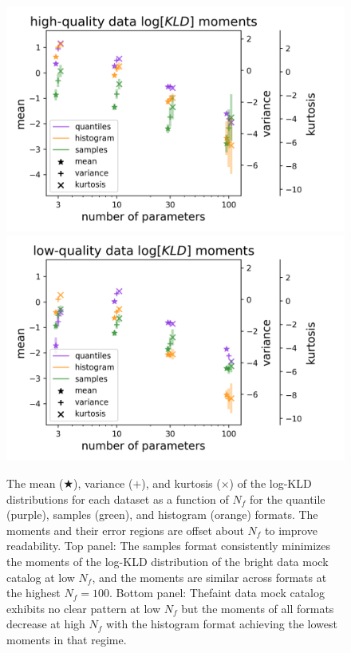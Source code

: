\documentclass[\docopts]{\docclass}
\newcommand{\mgdata}{bright\xspace}
\newcommand{\ssdata}{faint\xspace}
\begin{document}
\begin{figure}
  \begin{center}
    \includegraphics[width=\columnwidth]{graham_moments.png}\\
    \includegraphics[width=\columnwidth]{schmidt_moments.png}
    \caption{The mean ($\bigstar$), variance ($+$), and kurtosis ($\times$) of 
the log-KLD distributions for each dataset as a function of $N_{f}$ for the 
quantile (purple), samples (green), and histogram (orange) formats.
    The moments and their error regions are offset about $N_{f}$ to improve 
readability.
    Top panel: The samples format consistently minimizes the moments of the 
log-KLD distribution of the \mgdata data mock catalog at low $N_{f}$, and the 
moments are similar across formats at the highest $N_{f}=100$.
    Bottom panel: The\ssdata data mock catalog exhibits no clear pattern at low 
$N_{f}$ but the moments of all formats decrease at high $N_{f}$ with the 
histogram format achieving the lowest moments in that regime.
    \label{fig:moments}}
  \end{center}
\end{figure}
\end{document}
